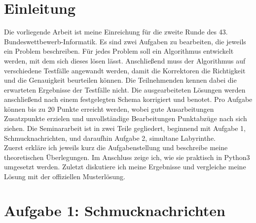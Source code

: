 \documentclass[a4paper,12pt,ngerman]{scrartcl}
\begin{document}
      


\setcounter{page}{2}
\tableofcontents
\newpage
{}

\vspace{0.5cm}

\section{Einleitung}
Die vorliegende Arbeit ist meine Einreichung für die zweite Runde des 43. Bundeswettbewerb-Informatik.
Es sind zwei Aufgaben zu bearbeiten, die jeweils ein Problem beschreiben.
Für jedes Problem soll ein Algorithmus entwickelt werden, mit dem sich dieses lösen lässt.
Anschließend muss der Algorithmus auf verschiedene Testfälle angewandt werden, damit die Korrektoren die Richtigkeit und die Genauigkeit beurteilen können.
Die Teilnehmenden kennen dabei die erwarteten Ergebnisse der Testfälle nicht.
Die ausgearbeiteten Lösungen werden anschließend nach einem festgelegten Schema korrigiert und benotet. Pro Aufgabe können bis zu 20 Punkte erreicht werden, 
wobei gute Ausarbeitungen Zusatzpunkte erzielen und unvollständige Bearbeitungen Punktabzüge nach sich ziehen.\cite{bwinf_aufgabe}
Die Seminararbeit ist in zwei Teile gegliedert, beginnend mit Aufgabe 1, Schmucknachrichten, und daraufhin Aufgabe 2, simultane Labyrinthe.\\
Zuerst erkläre ich jeweils kurz die Aufgabenstellung und beschreibe meine theoretischen Überlegungen. Im Anschluss zeige ich, wie sie praktisch in Python3 umgesetzt werden.
Zuletzt diskutiere ich meine Ergebnisse und vergleiche meine Lösung mit der offiziellen Musterlösung.
\section{Aufgabe 1: Schmucknachrichten}
\end{document}
